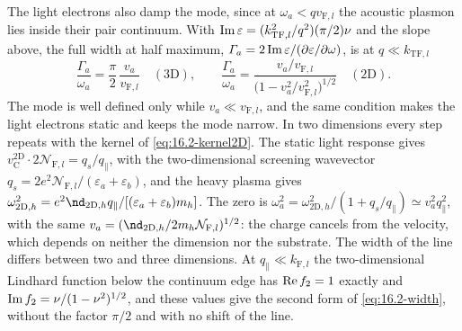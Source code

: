 The light electrons also damp the mode, since at $\omega_a < qv_{\mathrm{F},l}$ the acoustic plasmon lies inside their pair continuum. With $\operatorname{Im}\varepsilon = (k_{\mathrm{TF},l}^2/q^2)(\pi/2)\nu$ and the slope above, the full width at half maximum, $\varGamma_a = 2\operatorname{Im}\varepsilon/(\partial\varepsilon/\partial\omega)$, is at $q \ll k_{\mathrm{TF},l}$
\begin{equation}
  \frac{\varGamma_a}{\omega_a} = \frac{\pi}{2}\,\frac{v_a}{v_{\mathrm{F},l}} \quad (\text{3D}) ,
  \qquad
  \frac{\varGamma_a}{\omega_a} = \frac{v_a/v_{\mathrm{F},l}}{\bigl(1 - v_a^2/v_{\mathrm{F},l}^2\bigr)^{1/2}} \quad (\text{2D}) .
  \label{eq:16.2-width}
\end{equation}
The mode is well defined only while $v_a \ll v_{\mathrm{F},l}$, and the same condition makes the light electrons static and keeps the mode narrow. In two dimensions every step repeats with the kernel of \cref{eq:16.2-kernel2D}. The static light response gives $v_{\mathrm{C}}^{\mathrm{2D}}\cdot2\mathcal{N}_{\mathrm{F},l} = q_s/q_\parallel$, with the two-dimensional screening wavevector $q_s = 2e^2\mathcal{N}_{\mathrm{F},l}/(\varepsilon_a + \varepsilon_b)$, and the heavy plasma gives $\omega_{\mathrm{2D},h}^2 = e^2\nd_{\mathrm{2D},h}q_\parallel/[(\varepsilon_a + \varepsilon_b)m_h]$. The zero is $\omega_a^2 = \omega_{\mathrm{2D},h}^2/(1 + q_s/q_\parallel) \simeq v_a^2q_\parallel^2$, with the same $v_a = (\nd_{\mathrm{2D},h}/2m_h\mathcal{N}_{\mathrm{F},l})^{1/2}$: the charge cancels from the velocity, which depends on neither the dimension nor the substrate. The width of the line differs between two and three dimensions. At $q_\parallel \ll k_{\mathrm{F},l}$ the two-dimensional Lindhard function below the continuum edge has $\operatorname{Re} f_2 = 1$ exactly and $\operatorname{Im} f_2 = \nu/(1 - \nu^2)^{1/2}$, and these values give the second form of \cref{eq:16.2-width}, without the factor $\pi/2$ and with no shift of the line.

